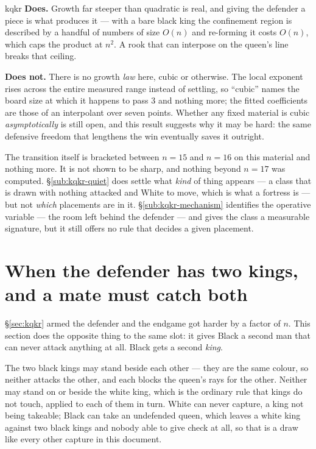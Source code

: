 \documentclass[11pt]{article}
\begin{document}
\begin{result}[title={What this does and does not settle}]{kqkr}
\textbf{Does.} Growth far steeper than quadratic is real, and giving the
defender a piece is what produces it --- with a bare black king the confinement
region is described by a handful of numbers of size $O(n)$ and re-forming it
costs $O(n)$, which caps the product at $n^2$. A rook that can interpose on the
queen's line breaks that ceiling.

\smallskip
\textbf{Does not.} There is no growth \emph{law} here, cubic or otherwise. The
local exponent rises across the entire measured range instead of settling, so
``cubic'' names the board size at which it happens to pass 3 and nothing more;
the fitted coefficients are those of an interpolant over seven points.
Whether any fixed material is cubic \emph{asymptotically} is still open, and
this result suggests why it may be hard: the same defensive freedom that
lengthens the win eventually saves it outright.

\smallskip
The transition itself is bracketed between $n=15$ and $n=16$ on this material
and nothing more. It is not shown to be sharp, and nothing beyond $n=17$ was
computed. \S\ref{sub:kqkr-quiet} does settle what \emph{kind} of thing appears --- a class that
is drawn with nothing attacked and White to move, which is what a fortress
is --- but not \emph{which} placements are in it. \S\ref{sub:kqkr-mechanism} identifies the operative
variable --- the room left behind the defender --- and gives the class a
measurable signature, but it still offers no rule that decides a given
placement.
\end{result}

\clearpage
\section{When the defender has two kings, and a mate must catch both}\label{sec:kqkk}

\S\ref{sec:kqkr} armed the defender and the endgame got harder by a factor of $n$. This
section does the opposite thing to the same slot: it gives Black a second man
that can never attack anything at all. Black gets a second \emph{king}.

The two black kings may stand beside each other --- they are the same colour,
so neither attacks the other, and each blocks the queen's rays for the other.
Neither may stand on or beside the white king, which is the ordinary rule that
kings do not touch, applied to each of them in turn. White can never capture, a
king not being takeable; Black can take an undefended queen, which leaves a
white king against two black kings and nobody able to give check at all, so
that is a draw like every other capture in this document.
\end{document}

